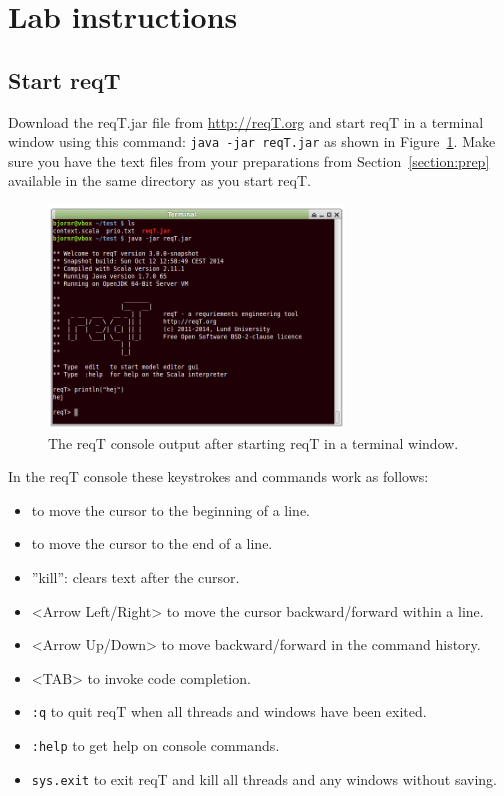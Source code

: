 \documentclass[11pt]{article}
\begin{document}
\section{Lab instructions}\label{section:instr}

\subsection{Start reqT}
Download the reqT.jar file from \url{http://reqT.org} and start reqT in a terminal window using this command: \verb+java -jar reqT.jar+ as shown in Figure~\ref{fig:console}. Make sure you have the text files from your preparations from Section~\ref{section:prep} available in the same directory as you start reqT.

\begin{figure}[h]
    \centering
    \includegraphics[width=0.7\textwidth]{console.png}
    \caption{The reqT console output after starting reqT in a terminal window.}
    \label{fig:console}
\end{figure}

In the reqT console these keystrokes and commands work as follows:
{\footnotesize 
\begin{itemize}[label={}]
\item <Ctrl+A> to move the cursor to the beginning of a line.
\item <Ctrl+E> to move the cursor to the end of a line.
\item <Ctrl+K> ''kill'': clears text after the cursor.
\item <Arrow Left/Right> to move the cursor backward/forward within a line. 
\item <Arrow Up/Down> to move backward/forward in the command history. 
\item <TAB> to invoke code completion.
\item \verb+:q+ to quit reqT when all threads and windows have been exited.
\item \verb+:help+ to get help on console commands.
\item \verb+sys.exit+ to exit reqT and kill all threads and any windows without saving.
\end{itemize}
}
\end{document}
